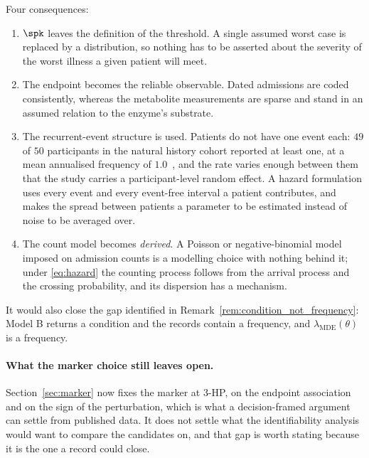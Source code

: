 Four consequences:

\begin{enumerate}[leftmargin=*, itemsep=2pt]
\item $\spk$ leaves the definition of the threshold. A single assumed worst case is
      replaced by a distribution, so nothing has to be asserted about the severity of the
      worst illness a given patient will meet.
\item The endpoint becomes the reliable observable. Dated admissions are coded
      consistently, whereas the metabolite measurements are sparse and stand in an assumed
      relation to the enzyme's substrate.
\item The recurrent-event structure is used. Patients do not have one
      event each: $49$ of $50$ participants in the natural history cohort reported at least
      one, at a mean annualised frequency of $1.0$~\cite{natural_history}, %
      and the rate varies enough between them that the study carries a participant-level
      random effect. A hazard formulation uses every event and every event-free interval a
      patient contributes, and makes the spread between patients a parameter to be estimated
      instead of noise to be averaged over.
\item The count model becomes \emph{derived}. A Poisson or
      negative-binomial model imposed on admission counts is a modelling choice with
      nothing behind it; under \eqref{eq:hazard} the counting process follows from the
      arrival process and the crossing probability, and its dispersion has a mechanism.
\end{enumerate}

It would also close the gap identified in Remark~\ref{rem:condition_not_frequency}: Model B
returns a condition and the records contain a frequency, and
$\lambda_{\mathrm{MDE}}(\theta)$ is a frequency.

\paragraph{What the marker choice still leaves open.} Section~\ref{sec:marker} now fixes the
marker at 3-HP, on the endpoint association and on the sign of the perturbation, which is
what a decision-framed argument can settle from published data. It does not settle what the
identifiability analysis would want to compare the candidates on, and that gap is worth
stating because it is the one a record could close.

